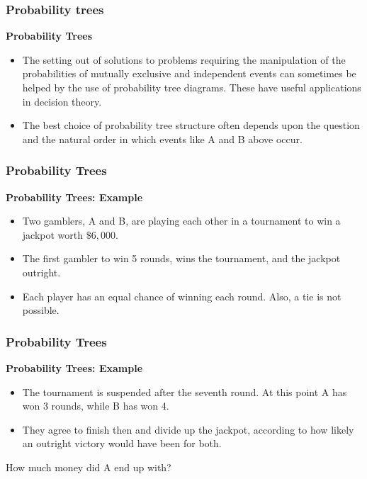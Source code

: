 \documentclass[IntroMain.tex]{subfiles}
\begin{document}
	
\begin{frame}
\frametitle{Probability trees}
\Large
\textbf{Probability Trees}

\begin{itemize}
\item The setting out of solutions to problems requiring the manipulation of the probabilities of mutually exclusive and independent events can sometimes be helped by the use of probability tree diagrams. These have useful applications in decision theory.

\item The best choice of probability tree structure often depends upon the question and the natural order in which events like A and B above occur.
\end{itemize}

\end{frame}
\begin{frame}
\frametitle{Probability Trees}
{
\large
\textbf{Probability Trees: Example}
\begin{itemize}
\item Two gamblers, A and B, are playing each other in a tournament to win a jackpot worth $\$6,000$. 
\item The first gambler to win 5 rounds, wins the tournament, and the jackpot outright.
\item Each player has an equal chance of winning each round. Also, a tie is not possible.

\end{itemize}

}
\end{frame}

\begin{frame}
	\frametitle{Probability Trees}
	{
		\large
		\textbf{Probability Trees: Example}
		\begin{itemize}
\item The tournament is suspended after the seventh round. At this point A has won 3 rounds, while B has won 4.
\item They agree to finish then and divide up the jackpot, according to how likely an outright victory would have been for both.
\end{itemize}
How much money did A end up with?
}
\end{frame}
\end{document}
